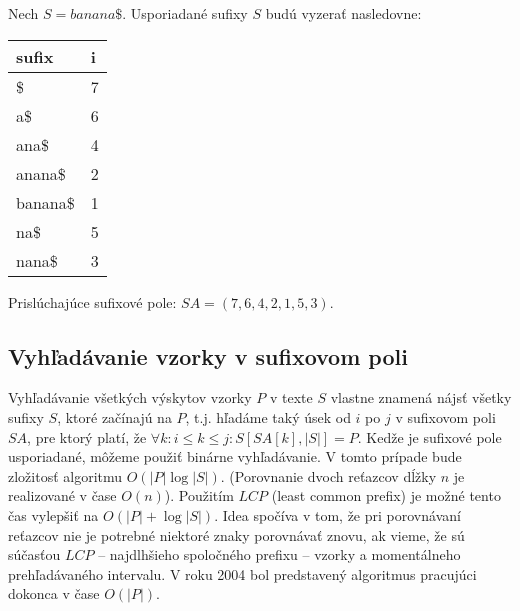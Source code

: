 \begin{example}
    Nech $S = banana\$$. Usporiadané sufixy $S$ budú vyzerať nasledovne:
    
    \bigskip
    \begin{center}
        \begin{tabular}{ | l | l | }
            \hline
            \textbf{sufix} & \textbf{i} \\ \hline
            \$             & 7          \\ \hline
            a\$            & 6          \\ \hline
            ana\$          & 4          \\ \hline
            anana\$        & 2          \\ \hline
            banana\$       & 1          \\ \hline
            na\$           & 5          \\ \hline
            nana\$         & 3          \\ \hline
        \end{tabular}
    \end{center}
    \bigskip
    
    Prislúchajúce sufixové pole: $SA = (7, 6, 4, 2, 1, 5, 3)$.
\end{example}

    \subsection{Vyhľadávanie vzorky v sufixovom poli}
    Vyhľadávanie všetkých výskytov vzorky $P$ v texte $S$ vlastne znamená nájsť
    všetky sufixy $S$, ktoré začínajú na $P$, t.j. hľadáme taký úsek od $i$ po
    $j$ v sufixovom poli $SA$, pre ktorý platí, že
    $\forall k: i \leq k \leq j: S[SA[k], \lvert S \rvert] = P$. Kedže je
    sufixové pole usporiadané, môžeme použiť binárne vyhľadávanie. V tomto
    prípade bude zložitosť algoritmu $O(\lvert P \rvert \log \lvert S \rvert)$.
    (Porovnanie dvoch reťazcov dĺžky $n$ je realizované v čase $O(n)$). Použitím
    $LCP$ (least common prefix) je možné tento čas vylepšiť na $O(\lvert P
    \rvert + \log{\lvert S \rvert})$. Idea spočíva v tom, že pri porovnávaní
    reťazcov nie je potrebné niektoré znaky porovnávať znovu, ak vieme, že sú
    súčasťou $LCP$ -- najdlhšieho spoločného prefixu -- vzorky a momentálneho
    prehľadávaného intervalu. V roku 2004 bol predstavený algoritmus
    \cite{AKO04} pracujúci dokonca v čase $O(\lvert P \rvert)$.
    
